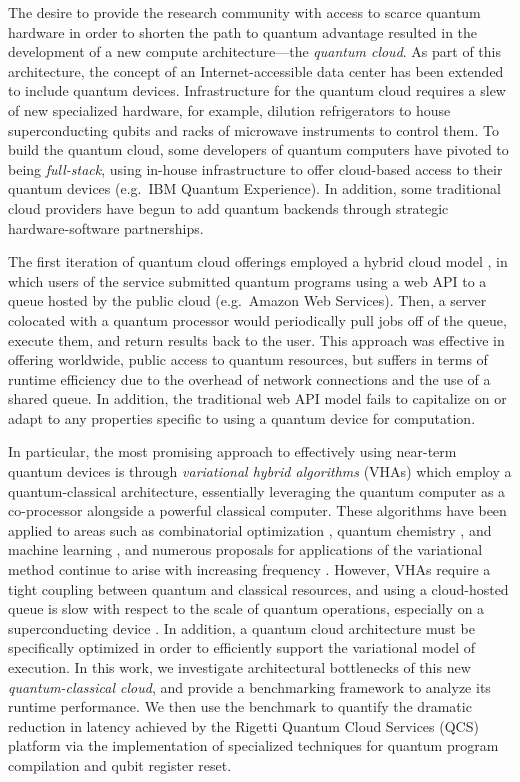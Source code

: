\documentclass[12pt]{iopart}
\begin{document}
The desire to provide the research community with access to scarce quantum hardware in order to shorten the path to quantum advantage resulted in the development of a new compute architecture---the \textit{quantum cloud}. As part of this architecture, the concept of an Internet-accessible data center has been extended to include quantum devices. Infrastructure for the quantum cloud requires a slew of new specialized hardware, for example, dilution refrigerators to house superconducting qubits and racks of microwave instruments to control them. To build the quantum cloud, some developers of quantum computers have pivoted to being \textit{full-stack}, using in-house infrastructure to offer cloud-based access to their quantum devices (e.g.\ IBM Quantum Experience). In addition, some traditional cloud providers have begun to add quantum backends through strategic hardware-software partnerships.

The first iteration of quantum cloud offerings employed a hybrid cloud model \cite{NISTCloudComputing}, in which users of the service submitted quantum programs using a web API to a queue hosted by the public cloud (e.g.\ Amazon Web Services). Then, a server colocated with a quantum processor would periodically pull jobs off of the queue, execute them, and return results back to the user. This approach was effective in offering worldwide, public access to quantum resources, but suffers in terms of runtime efficiency due to the overhead of network connections and the use of a shared queue. In addition, the traditional web API model fails to capitalize on or adapt to any properties specific to using a quantum device for computation.

In particular, the most promising approach to effectively using near-term quantum devices is through \textit{variational hybrid algorithms} (VHAs) \cite{McCleanTheoryVQE} which employ a quantum-classical architecture, essentially leveraging the quantum computer as a co-processor alongside a powerful classical computer. These algorithms have been applied to areas such as combinatorial optimization \cite{FarhiQAOA, RigettiClustering}, quantum chemistry \cite{PeruzzoPhotonicVQE, GoogleXmonVQE}, and machine learning \cite{RigettiQKS}, and numerous proposals for applications of the variational method continue to arise with increasing frequency \cite{Bravo-PietroVQLS, GuillaumeVQT}. However, VHAs require a tight coupling between quantum and classical resources, and using a cloud-hosted queue is slow with respect to the scale of quantum operations, especially on a superconducting device \cite{OliverSCStateOfPlay}. In addition, a quantum cloud architecture must be specifically optimized in order to efficiently support the variational model of execution. In this work, we investigate architectural bottlenecks of this new \textit{quantum-classical cloud}, and provide a benchmarking framework to analyze its runtime performance. We then use the benchmark to quantify the dramatic reduction in latency achieved by the Rigetti Quantum Cloud Services (QCS) platform via the implementation of specialized techniques for quantum program compilation and qubit register reset.
\end{document}
